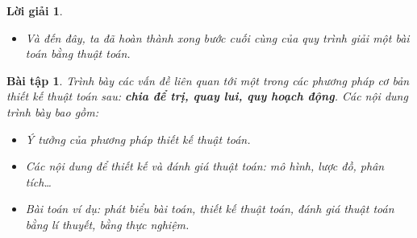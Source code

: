 \documentclass[14pt, a4paper]{article}
\theoremstyle{sltheorem}
\newtheorem{baitap}{Bài tập}
\theoremstyle{soltheorem}
\newtheorem*{loigiai}{Lời giải}
\begin{document}
\begin{loigiai}
\begin{enumerate}[a)]
\begin{enumerate}[1.]
\begin{itemize}
\begin{itemize}
                        \item Thuật toán có thể được đơn giản hơn hay không? Ví dụ: một công thức tính chu vi của hình chữ nhật sẽ như sau:
                        \begin{equation*}
                            C=length+width+length+width
                        \end{equation*}
                        Một lời giải tối ưu hơn sẽ như sau:
                        \begin{equation*}
                            C = 2 \times (length + width)
                        \end{equation*}
                        \item Lời giải này có tương tự lời giải cho một bài toán khác không? Chúng giống hoặc khác nhau như thế nào?
                    \end{itemize}
                    \item Và đến đây, ta đã hoàn thành xong bước cuối cùng của quy trình giải một bài toán bằng thuật toán.
                \end{itemize}
            \end{enumerate}
        \end{enumerate}
    \end{loigiai}

    \begin{baitap}
        Trình bày các vấn đề liên quan tới một trong các phương pháp cơ bản thiết kế
        thuật toán sau: \textbf{chia để trị, quay lui, quy hoạch động}. Các nội dung trình bày bao gồm:
        \begin{itemize} [label={$-$}]
            \item Ý tưởng của phương pháp thiết kế thuật toán.
            \item Các nội dung để thiết kế và đánh giá thuật toán: mô hình, lược đồ, phân tích…
            \item Bài toán ví dụ: phát biểu bài toán, thiết kế thuật toán, đánh giá thuật toán
            bằng lí thuyết, bằng thực nghiệm.
        \end{itemize}
    \end{baitap}
\end{document}
